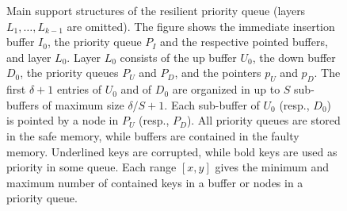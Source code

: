 \documentclass[review,number]{elsarticle}
\begin{document}
\begin{figure}
{}
  \caption{\label{fig:pqueue}Main support structures of the resilient priority
queue (layers $L_1, \ldots, L_{k-1}$ are omitted). The figure shows the
immediate insertion buffer $I_0$, the priority queue $P_I$ and the respective
pointed buffers, and layer $L_0$. Layer $L_0$ consists of the up buffer $U_0$,
the down buffer $D_0$, the priority queues $P_U$ and $P_D$, and the pointers
$p_U$ and $p_D$. The first $\delta+1$ entries of $U_0$ and of $D_0$ are
organized in up to $S$ sub-buffers of maximum size $\delta/S+1$. Each
sub-buffer of $U_0$ (resp., $D_0$) is pointed by a node in $P_U$ (resp., $P_D$).
All priority queues are stored in the safe memory, while buffers are
contained in the faulty memory. 
Underlined keys are corrupted, while bold keys are used as priority in some
queue.
Each range $[x,y]$ gives the minimum and maximum
number of contained keys in a buffer or nodes in a priority queue.
}
\end{figure}
\end{document}
